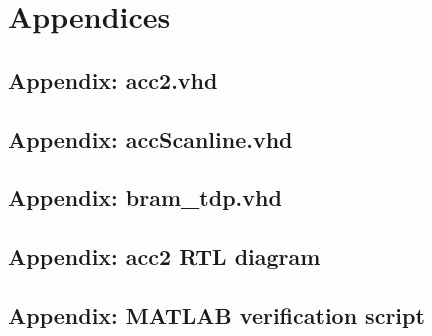 \appendix
\renewcommand{\thesection}{\Alph{section}}
\newpage
\section{Appendices}

\subsection{Appendix: acc2.vhd}
\label{app:acc2}		


\newpage
\subsection{Appendix: accScanline.vhd}
\label{app:accScanline}		


\newpage
\subsection{Appendix: bram\_tdp.vhd}
\label{app:bram}	


\newpage
\subsection{Appendix: acc2 RTL diagram}
\label{app:accBlockDiagram}


\newpage
\subsection{Appendix: MATLAB verification script}
\label{app:Matlab}
\lstset{language=Matlab} 
